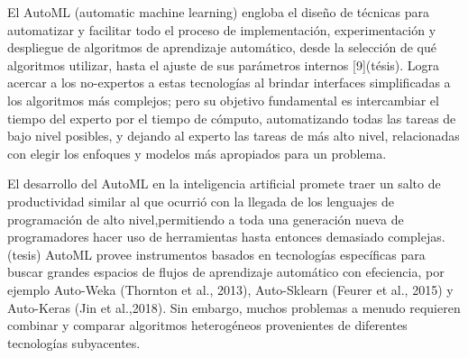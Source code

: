 





El AutoML (automatic machine learning) engloba
el diseño de técnicas para automatizar y facilitar todo el proceso de implementación, experimentación y despliegue de algoritmos de aprendizaje
automático, desde la selección de qué algoritmos utilizar, hasta el ajuste de
sus parámetros internos [9](tésis). Logra acercar a los no-expertos a estas tecnologías al brindar interfaces simplificadas a los algoritmos más complejos; pero su objetivo fundamental es intercambiar el tiempo del experto por el tiempo de cómputo, automatizando
todas las tareas de bajo nivel posibles, y dejando al experto las tareas de más
alto nivel, relacionadas con elegir los enfoques y modelos más apropiados
para un problema. \vspace{0.25cm}


El desarrollo del AutoML en la
inteligencia artificial promete traer un salto de productividad similar al
que ocurrió con la llegada de los lenguajes de programación de alto nivel,permitiendo a toda una generación nueva de programadores hacer uso de
herramientas hasta entonces demasiado complejas. (tesis) AutoML provee instrumentos basados en tecnologías específicas para buscar grandes espacios de flujos de aprendizaje automático con efeciencia, por ejemplo Auto-Weka (Thornton et al., 2013), Auto-Sklearn (Feurer et al., 2015) y Auto-Keras (Jin et al.,2018). Sin embargo, muchos problemas a menudo requieren combinar y comparar algoritmos heterogéneos provenientes de diferentes tecnologías subyacentes. \vspace{0.25cm}







